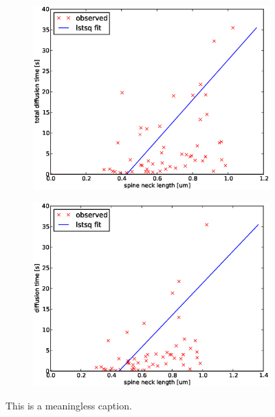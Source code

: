 \documentclass[main.tex]{subfiles}
\begin{document}
\begin{figure}[H]
 \centering
\begin{subfigure}[b]{0.48\textwidth}
 \includegraphics[width=\textwidth]{Figures/spine_stats_fulltime_nl.eps}
 \caption{}
 \label{results:spine_diffusion_stats:fulltime}
 \end{subfigure}
 \begin{subfigure}[b]{0.48\textwidth}
 \includegraphics[width=\textwidth]{Figures/spine_stats_reltime_nl.eps}
 \caption{}
 \label{results:spine_diffusion_stats:reltime}
\end{subfigure}
\caption[]{This is a meaningless caption.}
\label{results:spine_diffusion_stats}
\end{figure}
\end{document}
